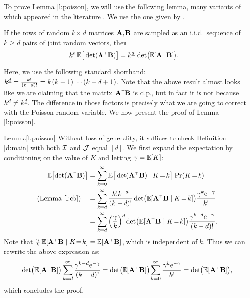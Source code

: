 To prove Lemma \ref{l:poisson}, we will use the following
lemma, many variants of which appeared in the literature
\cite[e.g.,][]{expected-generalized-variance}. We use the one given by
\cite{correcting-bias}.
\begin{lemma}\label{l:cb}
If the rows of random $k\times d$ matrices $\mathbf A,\mathbf B$
  are sampled as an i.i.d.~sequence of $k\geq d$ pairs of joint random vectors, then
\begin{align}
  k^d\,\E \big[\det(\A^\top\B)\big]
  &= \ktd\,\det\!\big(\E[\A^\top\B]\big).
     \end{align}
 \end{lemma}

\noindent
Here, we use the following standard shorthand: ${k^{\underline{d}}} =
\frac{k!}{(k-d)!} = k\,(k-1)\dotsm(k-d+1)$. Note that the above result
almost looks like we are claiming that the matrix $\A^\top\B$ is d.p.,
but in fact it is not because $k^d\neq {k^{\underline{d}}}$. The difference
in those factors is precisely what we are going to correct with the
Poisson random variable. We now present the proof of Lemma
\ref{l:poisson}.
\begin{proofof}{Lemma}{\ref{l:poisson}}
Without loss of generality, it suffices to check Definition \ref{d:main} with both $\mathcal I$ and
$\mathcal{J}$ equal $[d]$. We first expand the expectation by
conditioning on the value of $K$ and letting $\gamma=\mathbb E[K]$:
    \begin{align*}
      \E\big[\!\det(\A^\top\B)\big]
      &= \sum_{k=0}^\infty
\E\big[\det(\A^\top\B)\mid K\!=\!k\big]\
\Pr(K\!=\!k)\\
      \text{(Lemma \ref{l:cb})}
      \quad&=
        \sum_{k=d}^\infty\frac{k! k^{-d}}{(k-d)!}\det\!\big(\E[\A^\top\B\mid
        K\!=\!k]\big)
        \frac{\gamma^k\ee^{-\gamma}}{k!}\\
      &=\sum_{k=d}^\infty
\Big(\frac\gamma k\Big)^d\det\!\big(\E[\A^\top\B\mid K\!=\!k]\big)
        \frac{\gamma^{k-d}\ee^{-\gamma}}{(k-d)!}.
    \end{align*}
    Note that $\frac\gamma k\,\E[\A^\top\B\mid K\!=\!k]=\E[\A^\top\B]$,
    which is independent of $k$. Thus we can rewrite the above
    expression as:
    \begin{align*}
\det\!\big(\E[\A^\top\B]\big)\sum_{k=d}^\infty\frac{\gamma^{k-d}\ee^{-\gamma}}{(k-d)!}
      =
      \det\!\big(\E[\A^\top\B]\big)\sum_{k=0}^\infty
      \frac{\gamma^{k}\ee^{-\gamma}}{k!}=\det\!\big(\E[\A^\top\B]\big),
    \end{align*}
    which concludes the proof.
  \end{proofof}

